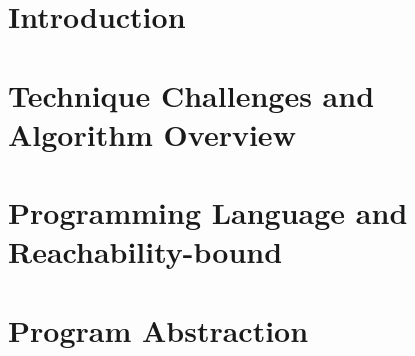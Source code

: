 \documentclass[manuscript,acmsmall,anonymous,review,screen,nonacm=true, authorversion=true]{acmart}
\begin{document}




\maketitle


\section{Introduction}
\label{sec:intro}



\section{Technique Challenges and Algorithm Overview}
\label{sec:overview}

\highlight{}
\section{Programming Language and Reachability-bound}
\label{sec:preliminary}
% 




\section{Program Abstraction}
\label{sec:progabs}

\end{document}
